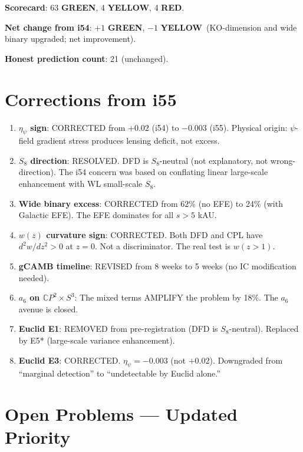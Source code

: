 \documentclass[11pt,a4paper]{article}
\newcommand{\GREEN}{\textcolor{dfdgreen}{\textbf{GREEN}}}
\newcommand{\YELLOW}{\textcolor{dfdyellow}{\textbf{YELLOW}}}
\newcommand{\RED}{\textcolor{dfdred}{\textbf{RED}}}
\newcommand{\CP}{\mathbb{C}P}
\begin{document}
\textbf{Scorecard}: 63 \GREEN, 4 \YELLOW, 4 \RED.

\textbf{Net change from i54}: $+1$ \GREEN, $-1$ \YELLOW\ (KO-dimension and wide binary upgraded; net improvement).

\textbf{Honest prediction count}: 21 (unchanged).


\section{Corrections from i55}
\label{sec:corrections}

\begin{enumerate}
\item \textbf{$\eta_\psi$ sign}: CORRECTED from $+0.02$ (i54) to $-0.003$ (i55). Physical origin: $\psi$-field gradient stress produces lensing deficit, not excess.
\item \textbf{$S_8$ direction}: RESOLVED. DFD is $S_8$-neutral (not explanatory, not wrong-direction). The i54 concern was based on conflating linear large-scale enhancement with WL small-scale $S_8$.
\item \textbf{Wide binary excess}: CORRECTED from 62\% (no EFE) to 24\% (with Galactic EFE). The EFE dominates for all $s > 5$ kAU.
\item \textbf{$w(z)$ curvature sign}: CORRECTED. Both DFD and CPL have $d^2w/dz^2 > 0$ at $z = 0$. Not a discriminator. The real test is $w(z > 1)$.
\item \textbf{gCAMB timeline}: REVISED from 8 weeks to 5 weeks (no IC modification needed).
\item \textbf{$a_6$ on $\CP^2 \times S^3$}: The mixed terms AMPLIFY the problem by 18\%. The $a_6$ avenue is closed.
\item \textbf{Euclid E1}: REMOVED from pre-registration (DFD is $S_8$-neutral). Replaced by E5* (large-scale variance enhancement).
\item \textbf{Euclid E3}: CORRECTED. $\eta_\psi = -0.003$ (not $+0.02$). Downgraded from ``marginal detection'' to ``undetectable by Euclid alone.''
\end{enumerate}


\section{Open Problems --- Updated Priority}
\label{sec:open}
\end{document}
